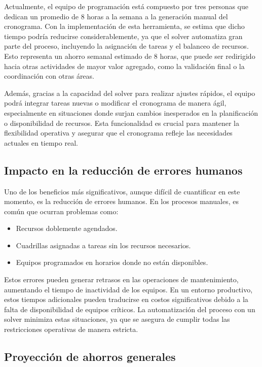 \documentclass{article}
\begin{document}
Actualmente, el equipo de programación está compuesto por tres personas que dedican un promedio de 8 horas a la semana a la generación manual del cronograma. Con la implementación de esta herramienta, se estima que dicho tiempo podría reducirse considerablemente, ya que el solver automatiza gran parte del proceso, incluyendo la asignación de tareas y el balanceo de recursos. Esto representa un ahorro semanal estimado de 8 horas, que puede ser redirigido hacia otras actividades de mayor valor agregado, como la validación final o la coordinación con otras áreas.

Además, gracias a la capacidad del solver para realizar ajustes rápidos, el equipo podrá integrar tareas nuevas o modificar el cronograma de manera ágil, especialmente en situaciones donde surjan cambios inesperados en la planificación o disponibilidad de recursos. Esta funcionalidad es crucial para mantener la flexibilidad operativa y asegurar que el cronograma refleje las necesidades actuales en tiempo real.

\subsection{Impacto en la reducción de errores humanos}

Uno de los beneficios más significativos, aunque difícil de cuantificar en este momento, es la reducción de errores humanos. En los procesos manuales, es común que ocurran problemas como:
\begin{itemize}
    \item Recursos doblemente agendados.
    \item Cuadrillas asignadas a tareas sin los recursos necesarios.
    \item Equipos programados en horarios donde no están disponibles.
\end{itemize}

Estos errores pueden generar retrasos en las operaciones de mantenimiento, aumentando el tiempo de inactividad de los equipos. En un entorno productivo, estos tiempos adicionales pueden traducirse en costos significativos debido a la falta de disponibilidad de equipos críticos. La automatización del proceso con un solver minimiza estas situaciones, ya que se asegura de cumplir todas las restricciones operativas de manera estricta.

\subsection{Proyección de ahorros generales}
\end{document}
